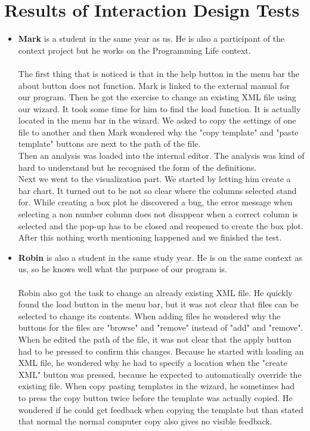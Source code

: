 \chapter{Results of Interaction Design Tests}\label{ch:results}
\begin{itemize}
\item \textbf{Mark} is a student in the same year as us. He is also a participant of the context project but he works on the Programming Life context.\\\\
The first thing that is noticed is that in the help button in the menu bar the about button does not function. Mark is linked to the external manual for our program. Then he got the exercise to change an existing XML file using our wizard. It took some time for him to find the load function. It is actually located in the menu bar in the wizard. We asked to copy the settings of one file to another and then Mark wondered why the "copy template" and "paste template" buttons are next to the path of the file.\\
Then an analysis was loaded into the internal editor. The analysis was kind of hard to understand but he recognised the form of the definitions.\\
Next we went to the visualization part. We started by letting him create a bar chart. It turned out to be not so clear where the columns selected stand for. While creating a box plot he discovered a bug, the error message when selecting a non number column does not disappear when a correct column is selected and the pop-up has to be closed and reopened to create the box plot. After this nothing worth mentioning happened and we finished the test.
\item \textbf{Robin} is also a student in the same study year. He is on the same context as us, so he knows well what the purpose of our program is.\\\\
Robin also got the task to change an already existing XML file. He quickly found the load button in the menu bar, but it was not clear that files can be selected to change its contents. When adding files he wondered why the buttons for the files are "browse" and "remove" instead of "add" and "remove". When he edited the path of the file, it was not clear that the apply button had to be pressed to confirm this changes. Because he started with loading an XML file, he wondered why he had to specify a location when the "create XML" button was pressed, because he expected to automatically override the existing file. When copy pasting templates in the wizard, he sometimes had to press the copy button twice before the template was actually copied. He wondered if he could get feedback when copying the template but than stated that normal the normal computer copy also gives no visible feedback.\\

\end{itemize}
